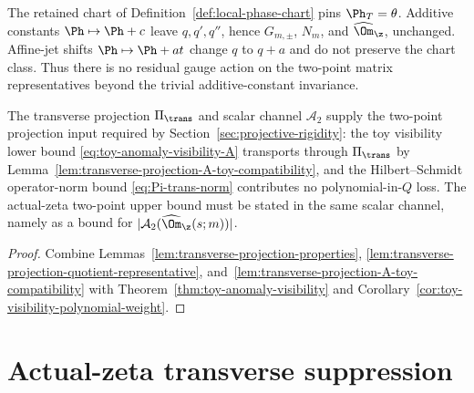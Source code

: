 \begin{remark}
\label{rem:transverse-projection-residual-gauge}
The retained chart of Definition~\ref{def:local-phase-chart} pins
\(\Ph_T=\theta\).  Additive constants \(\Ph\mapsto\Ph+c\) leave
\(q,q',q''\), hence \(G_{m,\pm}\), \(N_m\), and \(\widehat\Om_\z\),
unchanged.  Affine-jet shifts \(\Ph\mapsto\Ph+at\) change \(q\) to
\(q+a\) and do not preserve the chart class.  Thus there is no
residual gauge action on the two-point matrix representatives beyond
the trivial additive-constant invariance.
\end{remark}

\begin{lemma}
\label{lem:transverse-projection-sufficient}
The transverse projection \(\Pi_\trans\) and scalar channel
\(\mathcal A_2\) supply the two-point projection input required by
Section~\ref{sec:projective-rigidity}: the toy visibility lower bound
\eqref{eq:toy-anomaly-visibility-A} transports through
\(\Pi_\trans\) by
Lemma~\ref{lem:transverse-projection-A-toy-compatibility}, and the
Hilbert--Schmidt operator-norm bound
\eqref{eq:Pi-trans-norm} contributes no polynomial-in-\(Q\) loss.
The actual-zeta two-point upper bound must be stated in the same
scalar channel, namely as a bound for
\(|\mathcal A_2(\widehat\Om_\z(s;m))|\).
\end{lemma}

\begin{proof}
Combine Lemmas~\ref{lem:transverse-projection-properties},
\ref{lem:transverse-projection-quotient-representative},
and~\ref{lem:transverse-projection-A-toy-compatibility} with
Theorem~\ref{thm:toy-anomaly-visibility} and
Corollary~\ref{cor:toy-visibility-polynomial-weight}.
\end{proof}


\section{Actual-zeta transverse suppression}
\label{sec:actual-zeta-transverse-suppression}
\quad
{}\quad
{}\quad
{}\quad
{}\quad
{}
\par\medskip


